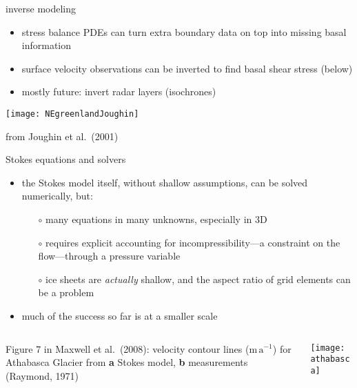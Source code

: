 \begin{frame}{inverse modeling}

\begin{itemize}
\item stress balance PDEs can turn extra boundary data on top into missing basal information
\item surface velocity observations can be inverted to find basal shear stress (below)
\item mostly future: invert radar layers (isochrones)
\end{itemize}

\begin{center}
  \texttt{[image: NEgreenlandJoughin]}
  
  \medskip
  \tiny from Joughin et al.~(2001)\nocite{Joughinetal2001}
\end{center}
\end{frame}


\begin{frame}{Stokes equations and solvers}

\begin{itemize}
\item the Stokes model itself, without shallow assumptions, can be solved numerically, \alert{but}:
  \begin{itemize}
  \item[$\circ$] many equations in many unknowns, especially in 3D
  \item[$\circ$] requires explicit accounting for incompressibility---a constraint on the flow---through a pressure variable
  \item[$\circ$] ice sheets are \emph{actually} shallow, and the aspect ratio of grid elements can be a problem
  \end{itemize}
\item much of the success so far is at a smaller scale
\end{itemize}

\begin{columns}
\begin{column}{0.45\textwidth}
\scriptsize

Figure 7 in Maxwell et al.~(2008)\nocite{Maxwelletal2008}:  velocity contour lines ($\text{m}\,\text{a}^{-1}$) for Athabasca Glacier from \textbf{a} Stokes model, \textbf{b} measurements (Raymond, 1971)\nocite{Raymond1971}
\end{column}
\begin{column}{0.6\textwidth}
\texttt{[image: athabasca]}
\end{column}
\end{columns}
\end{frame}


